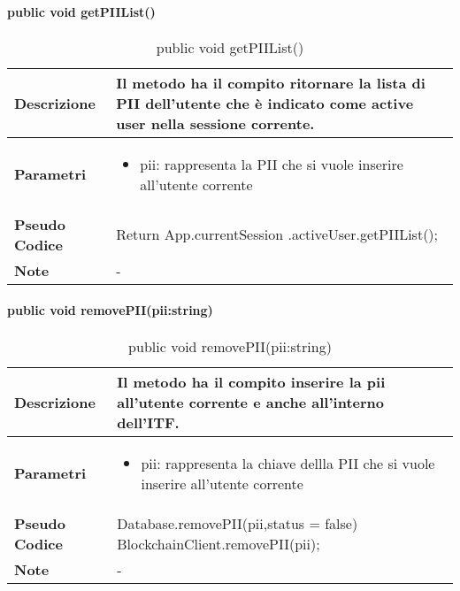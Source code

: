 \paragraph{public void getPIIList()}
\begin{center}
    \begin{longtable}{|p{3cm}|p{9cm}|}%
    \caption{public void getPIIList()}
    \endfirsthead
    \endhead
    \hline
    \textbf{Descrizione} & Il metodo ha il compito ritornare la lista di PII dell’utente che è indicato come active user nella sessione corrente.\\
    \hline
    \textbf{Parametri} &      
    \begin{itemize}
        \item pii: rappresenta la PII che si vuole inserire all’utente corrente
    \end{itemize}
    \\
    \hline
    \textbf{Pseudo Codice} & 
    Return \newline
    App.currentSession \newline
    .activeUser.getPIIList(); \newline
    \\
    \hline
    \textbf{Note} & 
    -
    \\
    \hline
    \end{longtable}
\end{center}

\paragraph{public void removePII(pii:string)}
\begin{center}
    \begin{longtable}{|p{3cm}|p{9cm}|}%
    \caption{public void removePII(pii:string)}
    \endfirsthead
    \endhead
    \hline
    \textbf{Descrizione} & Il metodo ha il compito inserire la pii all’utente corrente e anche all’interno dell’ITF.\\
    \hline
    \textbf{Parametri} &      
    \begin{itemize}
        \item pii: rappresenta la chiave dellla PII che si vuole inserire all’utente corrente
    \end{itemize}
    \\
    \hline
    \textbf{Pseudo Codice} & 
    Database.removePII(pii,status = false)\newline
    BlockchainClient.removePII(pii);\newline
    \\
    \hline
    \textbf{Note} & 
    -
    \\
    \hline
    \end{longtable}
\end{center}



